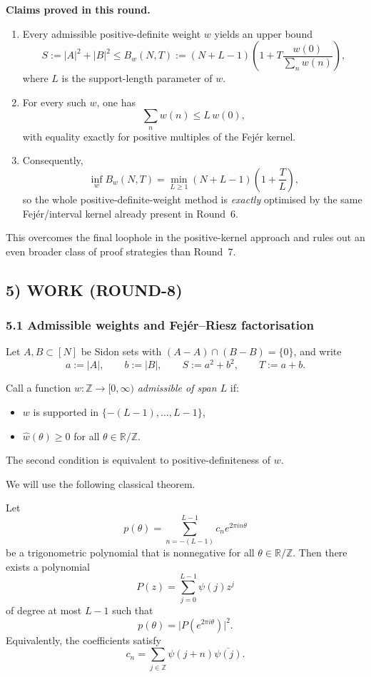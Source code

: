 \textbf{Claims proved in this round.}
\begin{enumerate}
\item Every admissible positive-definite weight $w$ yields an upper bound
\[
S:=|A|^2+|B|^2\le B_w(N,T):=(N+L-1)\left(1+T\frac{w(0)}{\sum_n w(n)}\right),
\]
where $L$ is the support-length parameter of $w$.
\item For every such $w$, one has
\[
\sum_n w(n)\le L\,w(0),
\]
with equality exactly for positive multiples of the Fej\'er kernel.
\item Consequently,
\[
\inf_w B_w(N,T)=\min_{L\ge 1}(N+L-1)\left(1+\frac{T}{L}\right),
\]
so the whole positive-definite-weight method is \emph{exactly} optimised by the same Fej\'er/interval kernel already present in Round~6.
\end{enumerate}

This overcomes the final loophole in the positive-kernel approach and rules out an even broader class of proof strategies than Round~7.

\subsection{5) WORK (ROUND-8)}

\subsubsection{5.1 Admissible weights and Fej\'er--Riesz factorisation}

Let $A,B\subset[N]$ be Sidon sets with $(A-A)\cap(B-B)=\{0\}$, and write
\[
a:=|A|,\qquad b:=|B|,\qquad S:=a^2+b^2,\qquad T:=a+b.
\]

Call a function $w:\mathbb Z\to[0,\infty)$ \emph{admissible of span $L$} if:
\begin{itemize}
\item $w$ is supported in $\{-(L-1),\dots,L-1\}$,
\item $\widehat w(\theta)\ge 0$ for all $\theta\in\mathbb R/\mathbb Z$.
\end{itemize}
The second condition is equivalent to positive-definiteness of $w$.

We will use the following classical theorem.

\begin{theorem}
\label{thm:FR}
Let
\[
p(\theta)=\sum_{n=-(L-1)}^{L-1} c_n e^{2\pi i n\theta}
\]
be a trigonometric polynomial that is nonnegative for all $\theta\in\mathbb R/\mathbb Z$.  Then there exists a polynomial
\[
P(z)=\sum_{j=0}^{L-1}\psi(j)z^j
\]
of degree at most $L-1$ such that
\[
p(\theta)=\bigl|P(e^{2\pi i\theta})\bigr|^2.
\]
Equivalently, the coefficients satisfy
\[
c_n=\sum_{j\in\mathbb Z}\psi(j+n)\overline{\psi(j)}.
\]
\end{theorem}

